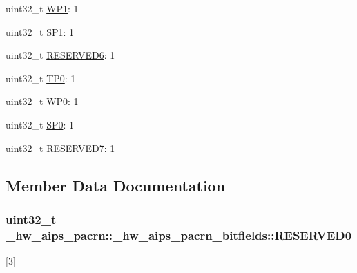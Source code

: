 \begin{DoxyCompactItemize}
\item 
uint32\+\_\+t \hyperlink{struct__hw__aips__pacrn_1_1__hw__aips__pacrn__bitfields_a93bbce86ed719f206558c5497f4d43fc}{W\+P1}\+: 1
\item 
uint32\+\_\+t \hyperlink{struct__hw__aips__pacrn_1_1__hw__aips__pacrn__bitfields_a1b107709c7de85ccfb1ed1437ae3a130}{S\+P1}\+: 1
\item 
uint32\+\_\+t \hyperlink{struct__hw__aips__pacrn_1_1__hw__aips__pacrn__bitfields_a5f9c40a55b19f39d394f7ecdfaffdd96}{R\+E\+S\+E\+R\+V\+E\+D6}\+: 1
\item 
uint32\+\_\+t \hyperlink{struct__hw__aips__pacrn_1_1__hw__aips__pacrn__bitfields_ae4f9391ba9673f1ff676929afd02f98a}{T\+P0}\+: 1
\item 
uint32\+\_\+t \hyperlink{struct__hw__aips__pacrn_1_1__hw__aips__pacrn__bitfields_a7cc39d743777fc3ad22fbada0e6c86ff}{W\+P0}\+: 1
\item 
uint32\+\_\+t \hyperlink{struct__hw__aips__pacrn_1_1__hw__aips__pacrn__bitfields_a1e7cb0a40deb198a5898b87ca0ac350b}{S\+P0}\+: 1
\item 
uint32\+\_\+t \hyperlink{struct__hw__aips__pacrn_1_1__hw__aips__pacrn__bitfields_a84a5b6aa771bff550fb5359e1b89cb07}{R\+E\+S\+E\+R\+V\+E\+D7}\+: 1
\end{DoxyCompactItemize}


\subsection{Member Data Documentation}
\subsubsection[{\texorpdfstring{R\+E\+S\+E\+R\+V\+E\+D0}{RESERVED0}}]{\setlength{\rightskip}{0pt plus 5cm}uint32\+\_\+t \+\_\+hw\+\_\+aips\+\_\+pacrn\+::\+\_\+hw\+\_\+aips\+\_\+pacrn\+\_\+bitfields\+::\+R\+E\+S\+E\+R\+V\+E\+D0}\hypertarget{struct__hw__aips__pacrn_1_1__hw__aips__pacrn__bitfields_a1390d725956b322b659a9340912b0498}{}\label{struct__hw__aips__pacrn_1_1__hw__aips__pacrn__bitfields_a1390d725956b322b659a9340912b0498}
\mbox{[}3\mbox{]} 

